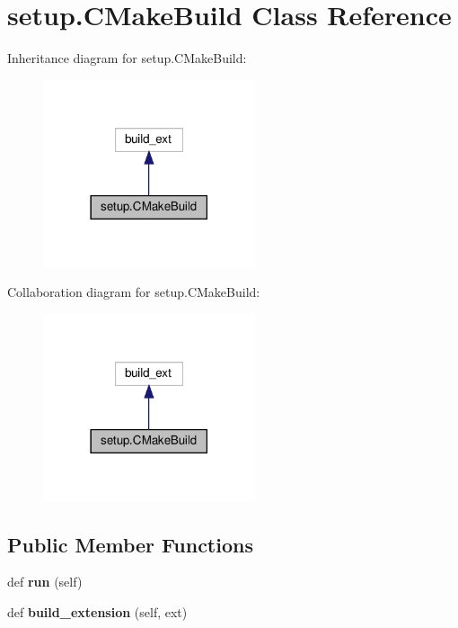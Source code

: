 \hypertarget{classsetup_1_1CMakeBuild}{}\section{setup.\+C\+Make\+Build Class Reference}
\label{classsetup_1_1CMakeBuild}


Inheritance diagram for setup.\+C\+Make\+Build\+:
\nopagebreak
\begin{figure}[H]
\begin{center}
\leavevmode
\includegraphics[width=177pt]{classsetup_1_1CMakeBuild__inherit__graph}
\end{center}
\end{figure}


Collaboration diagram for setup.\+C\+Make\+Build\+:
\nopagebreak
\begin{figure}[H]
\begin{center}
\leavevmode
\includegraphics[width=177pt]{classsetup_1_1CMakeBuild__coll__graph}
\end{center}
\end{figure}
\subsection*{Public Member Functions}
\begin{DoxyCompactItemize}
\item 
\mbox{\label{classsetup_1_1CMakeBuild_aaeaa47a0e82fe56564dd8cec58f772c9}} 
def {\bfseries run} (self)
\item 
\mbox{\label{classsetup_1_1CMakeBuild_a7b078d0cd6b68f830254e3d96a9e96b1}} 
def {\bfseries build\+\_\+extension} (self, ext)
\end{DoxyCompactItemize}
